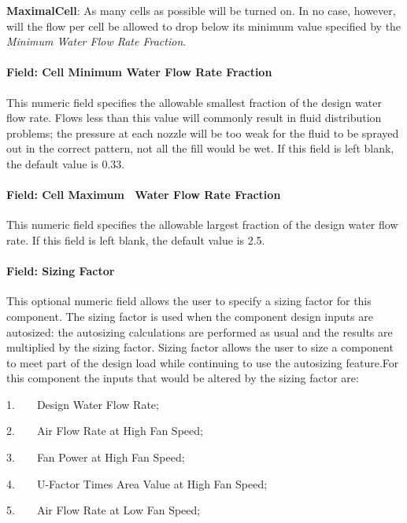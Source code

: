 \textbf{MaximalCell}: As many cells as possible will be turned on. In no case, however, will the flow per cell be allowed to drop below its minimum value specified by the \emph{Minimum Water Flow Rate Fraction}.

\paragraph{Field: Cell Minimum Water Flow Rate Fraction}\label{field-cell-minimum-water-flow-rate-fraction-1}

This numeric field specifies the allowable smallest fraction of the design water flow rate. Flows less than this value will commonly result in fluid distribution problems; the pressure at each nozzle will be too weak for the fluid to be sprayed out in the correct pattern, not all the fill would be wet. If this field is left blank, the default value is 0.33.

\paragraph{Field: Cell Maximum~ Water Flow Rate Fraction}\label{field-cell-maximum-water-flow-rate-fraction-1}

This numeric field specifies the allowable largest fraction of the design water flow rate. If this field is left blank, the default value is 2.5.

\paragraph{Field: Sizing Factor}\label{field-sizing-factor}

This optional numeric field allows the user to specify a sizing factor for this component. The sizing factor is used when the component design inputs are autosized: the autosizing calculations are performed as usual and the results are multiplied by the sizing factor. Sizing factor allows the user to size a component to meet part of the design load while continuing to use the autosizing feature.For this component the inputs that would be altered by the sizing factor are:

1.~~~~Design Water Flow Rate;

2.~~~~Air Flow Rate at High Fan Speed;

3.~~~~Fan Power at High Fan Speed;

4.~~~~U-Factor Times Area Value at High Fan Speed;

5.~~~~Air Flow Rate at Low Fan Speed;

